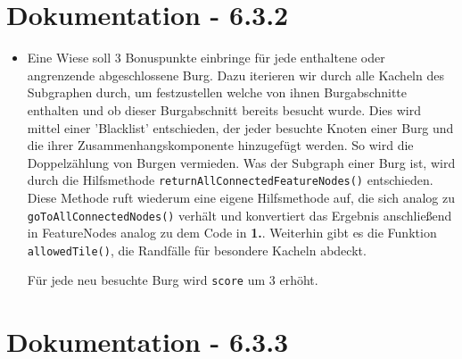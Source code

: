 \begin{itemize}
\begin{itemize}
		
		\end{itemize}
	
	
\end{itemize}

\clearpage

\section{Dokumentation - 6.3.2}

\begin{itemize}
\item[]
	Eine Wiese soll 3 Bonuspunkte einbringe für jede enthaltene oder angrenzende abgeschlossene Burg.
	Dazu iterieren wir durch alle Kacheln des Subgraphen durch, um festzustellen welche von ihnen Burgabschnitte enthalten und ob dieser Burgabschnitt bereits besucht wurde. Dies wird mittel einer 'Blacklist' entschieden, der jeder besuchte 
	Knoten einer Burg und die ihrer Zusammenhangskomponente hinzugefügt werden. So wird die Doppelz\"ahlung von Burgen vermieden. Was der Subgraph einer Burg ist, wird durch die Hilfsmethode \texttt{returnAllConnectedFeatureNodes()} 
	entschieden. Diese Methode ruft wiederum eine eigene Hilfsmethode auf, die sich analog zu \texttt{goToAllConnectedNodes()} verhält und konvertiert das Ergebnis anschließend in FeatureNodes analog zu dem Code in \textbf{1.}. Weiterhin 
	gibt es die Funktion \texttt{allowedTile()}, die Randfälle für besondere Kacheln abdeckt.

	Für jede neu besuchte Burg wird \texttt{score} um 3 erhöht.
\end{itemize}

\clearpage

\section{Dokumentation - 6.3.3}

